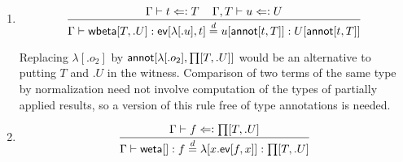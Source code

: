 \documentclass[11pt]{article}
\newcommand{\eqd}{\stackrel{d}{=}}
\newcommand{\spc}{{\,\,\,\,\,\,\,}}
\newcommand{\force}{\Leftarrow\vcentcolon}
\newcommand{\ha}[2]{#1[#2]}
\newcommand{\weta}{{\sf weta}}
\newcommand{\annot}{{\sf annot}}
\newcommand{\ev}{{\sf ev}}
\newcommand{\wbeta}{{\sf wbeta}}
\begin{document}
\begin{enumerate}
\item 
$$\frac{ \Gamma\vdash t \force T\spc \Gamma, T\vdash u \force U}{\Gamma\vdash \ha\wbeta{T,.U} : \ha\ev{\ha\lambda{.u},t} \eqd u[\ha\annot{t,T}] : U[\ha\annot{t,T}]}$$

Replacing $\ha\lambda{.o_2}$ by
$\ha\annot{\ha\lambda{.o_2},\ha\prod{T,.U}}$ would be an alternative to
putting $T$ and $.U$ in the witness.  Comparison of two terms of the same
type by normalization need not involve computation of the types of partially
applied results, so a version of this rule free of type annotations is needed.

\item 
$$\frac{\Gamma\vdash f \force \ha\prod{T,.U}}{\Gamma\vdash \ha\weta{} : f \eqd \ha\lambda{x.\ha\ev{f,x}} : \ha\prod{T,.U}}$$ 

\end{enumerate}



\end{document}
